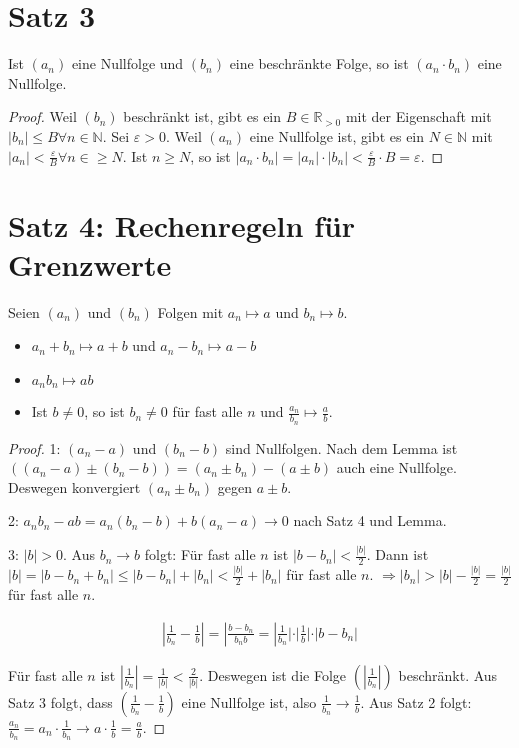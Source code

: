 \documentclass[a4paper,10pt]{article}
\begin{document}
\section*{Satz 3}

Ist $(a_n)$ eine Nullfolge und $(b_n)$ eine beschränkte Folge, so ist $(a_n \cdot b_n)$ eine Nullfolge.

\begin{proof}
 Weil $(b_n)$ beschränkt ist, gibt es ein $B \in \mathbb{R}_{> 0}$ mit der Eigenschaft mit $|b_n| \le B \forall n \in \mathbb{N}$.
 Sei $\varepsilon > 0$.
 Weil $(a_n)$ eine Nullfolge ist, gibt es ein $N \in \mathbb{N}$ mit $|a_n| < \frac{\varepsilon}{B} \forall n \in \ge N$.
 Ist $n \ge N$, so ist $|a_n \cdot b_n| = |a_n| \cdot |b_n| < \frac{\varepsilon}{B} \cdot B = \varepsilon$.
\end{proof}

\section*{Satz 4: Rechenregeln für Grenzwerte}

Seien $(a_n)$ und $(b_n)$ Folgen mit $a_n \mapsto a$ und $b_n \mapsto b$.

\begin{itemize}
 \item $a_n + b_n \mapsto a + b$ und $a_n - b_n \mapsto a - b$
 \item $a_nb_n \mapsto ab$
 \item Ist $b \ne 0$, so ist $b_n \ne 0$ für fast alle $n$ und $\frac{a_n}{b_n} \mapsto \frac{a}{b}$.
\end{itemize}

\begin{proof}
 1: $(a_n - a)$ und $(b_n - b)$ sind Nullfolgen.
 Nach dem Lemma ist $((a_n - a) \pm (b_n - b)) = (a_n \pm b_n) - (a \pm b)$ auch eine Nullfolge.
 Deswegen konvergiert $(a_n \pm b_n)$ gegen $a \pm b$.
 
 2: $a_nb_n - ab = a_n(b_n - b) + b(a_n - a) \rightarrow 0$ nach Satz 4 und Lemma.
 
 3: $|b| > 0$. Aus $b_n \rightarrow b$ folgt: Für fast alle $n$ ist $|b - b_n| < \frac{|b|}{2}$.
 Dann ist $|b| = |b - b_n + b_n| \le |b - b_n| + |b_n| < \frac{|b|}{2} + |b_n|$ für fast alle $n$.
 $\Rightarrow |b_n| > |b| - \frac{|b|}{2} = \frac{|b|}{2}$ für fast alle $n$.
 
 \begin{align*}
  |\frac{1}{b_n} - \frac{1}{b}| = |\frac{b - b_n}{b_nb} = |\frac{1}{b_n}| \cdot |\frac{1}{b}| \cdot |b - b_n|
 \end{align*}
 
 Für fast alle $n$ ist $|\frac{1}{b_n}| = \frac{1}{|b|} < \frac{2}{|b|}$.
 Deswegen ist die Folge $(|\frac{1}{b_n}|)$ beschränkt.
 Aus Satz 3 folgt, dass $(\frac{1}{b_n} - \frac{1}{b})$ eine Nullfolge ist, also $\frac{1}{b_n} \rightarrow \frac{1}{b}$.
 Aus Satz 2 folgt: $\frac{a_n}{b_n} = a_n \cdot \frac{1}{b_n} \rightarrow a \cdot \frac{1}{b} = \frac{a}{b}$.
\end{proof}
\end{document}
